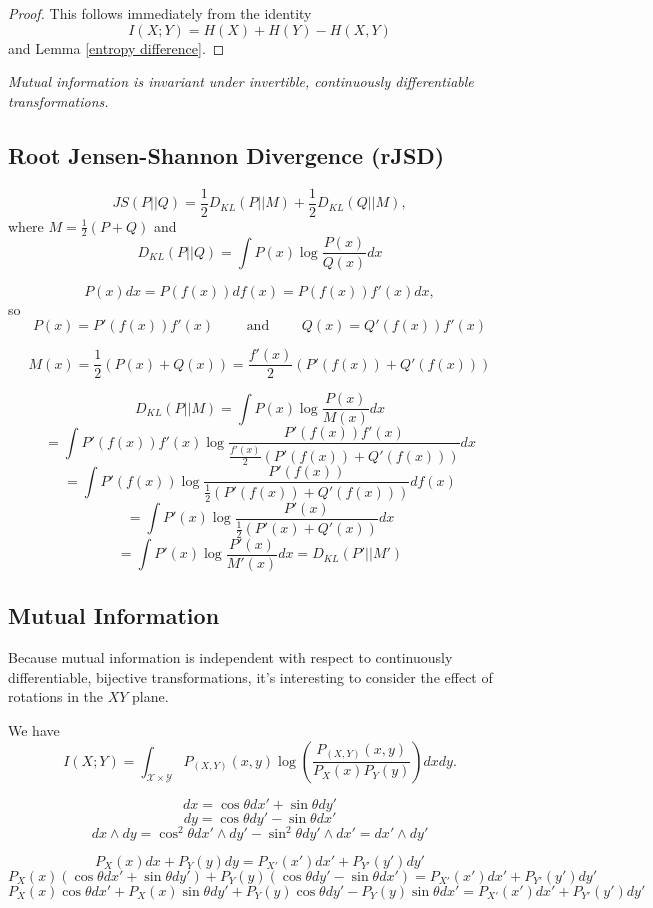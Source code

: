 \documentclass[12pt]{article}
\begin{document}
\begin{proof}
    This follows immediately from the identity
    $$I(X;Y) = H(X) + H(Y) - H(X,Y)$$
    and Lemma \ref{entropy difference}.
\end{proof}

\begin{center}
\it Mutual information is invariant under invertible, continuously differentiable transformations.
\end{center}

\newpage

\subsection*{Root Jensen-Shannon Divergence (rJSD)}

$$JS(P||Q) =\frac{1}{2}D_{KL}(P||M) + \frac{1}{2}D_{KL}(Q||M),$$
where $M = \frac{1}{2}(P+Q)$ and
$$D_{KL}(P||Q) = \int P(x) \log \frac{P(x)}{Q(x)}dx$$

$$P(x)dx = P(f(x))df(x) = P(f(x))f'(x) dx,$$
so
$$P(x) = P'(f(x))f'(x) \qquad\text{ and }\qquad Q(x) = Q'(f(x))f'(x)$$

$$M(x) = \frac{1}{2}(P(x)+Q(x)) = \frac{f'(x)}{2}(P'(f(x)) + Q'(f(x)))$$

$$D_{KL}(P||M) = \int P(x)\log\frac{P(x)}{M(x)}dx$$
$$= \int P'(f(x))f'(x)\log\frac{P'(f(x))f'(x)}{\frac{f'(x)}{2}(P'(f(x)) + Q'(f(x)))}dx$$
$$= \int P'(f(x))\log\frac{P'(f(x))}{\frac{1}{2}(P'(f(x)) + Q'(f(x)))}df(x)$$
$$= \int P'(x)\log\frac{P'(x)}{\frac{1}{2}(P'(x) + Q'(x))}dx$$
$$= \int P'(x)\log\frac{P'(x)}{M'(x)}dx = D_{KL}(P'||M')$$

\subsection*{Mutual Information}

Because mutual information is independent with respect to continuously differentiable, bijective transformations, it's interesting to consider the effect of rotations in the $XY$ plane.

We have
$$I(X;Y) = \int_{\mathcal{X}\times\mathcal{Y}}P_{(X,Y)}(x,y)\log\left(\frac{P_{(X,Y)}(x,y)}{P_X(x)P_Y(y)}\right)dxdy.$$

$$dx = \cos \theta dx' + \sin \theta dy'$$
$$dy = \cos \theta dy' - \sin \theta dx'$$
$$dx \wedge dy = \cos^2\theta dx' \wedge dy' - \sin^2\theta dy' \wedge dx' = dx' \wedge dy'$$

$$P_{X}(x)dx + P_{Y}(y)dy = P_{X'}(x')dx' + P_{Y'}(y')dy'$$
$$P_{X}(x)(\cos\theta dx' + \sin\theta dy') + P_{Y}(y)(\cos\theta dy' - \sin\theta dx') = P_{X'}(x')dx' + P_{Y'}(y')dy'$$
$$P_{X}(x)\cos\theta dx' + P_{X}(x) \sin\theta dy' + P_{Y}(y)\cos\theta dy' - P_{Y}(y) \sin\theta dx' = P_{X'}(x')dx' + P_{Y'}(y')dy'$$
\end{document}

